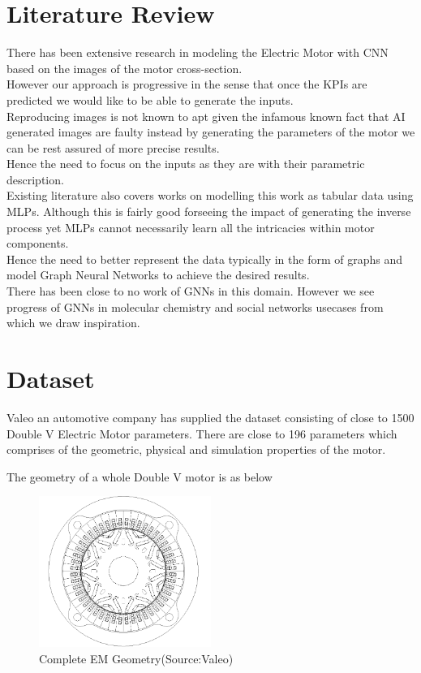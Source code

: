 \documentclass{report} %
\begin{document}
\chapter{Literature Review} 
There has been extensive research in modeling the Electric Motor with \ac{CNN} based on the images of the motor cross-section. \\
However our approach is progressive in the sense that once the \ac{KPI}s are predicted we would like to be able to generate the inputs.\\
Reproducing images is not known to apt given the infamous known fact that AI generated images are faulty instead by generating the parameters of the motor we can be rest assured of more precise results. \\
Hence the need to focus on the inputs as they are with their parametric description.\\
Existing literature also covers works on modelling this work as tabular data using \ac{MLP}s. 
Although this is fairly good forseeing the impact of generating the inverse process yet \ac{MLP}s cannot necessarily learn all the intricacies within motor components. \\
Hence the need to better represent the data typically in the form of graphs and model Graph Neural Networks to achieve the desired results. \\
There has been close to no work of \ac{GNN}s in this domain. However we see progress of \ac{GNN}s in molecular chemistry and social networks usecases from which we draw inspiration.\\

\newpage 

\chapter{Dataset} 
Valeo an automotive company has supplied the dataset consisting of close to 1500 Double V Electric Motor parameters. 
There are close to 196 parameters which comprises of the geometric, physical and simulation properties of the motor.

The geometry of a whole Double V motor is as below

\begin{figure}[H]
    \centering
    \includegraphics[width=0.5\textwidth]{./ReportImages/FullMotorv2.png} 
    \caption{Complete EM Geometry(Source:Valeo)}
    \label{fig:Full Motor}
\end{figure}
\end{document}
